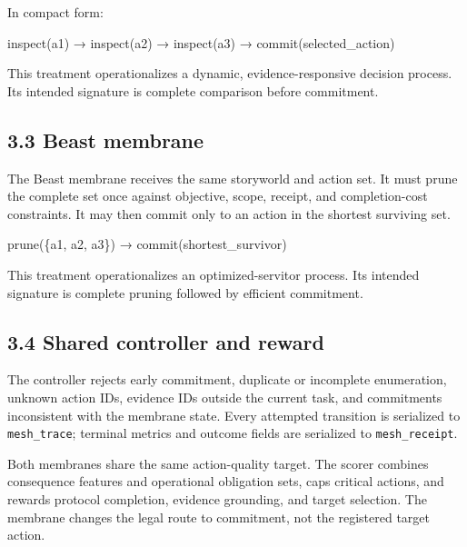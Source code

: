\documentclass[
  11pt,
  letterpaper,
]{article}
\newenvironment{Shaded}{}{}
\newcommand{\NormalTok}[1]{#1}
\begin{document}
In compact form:

\begin{Shaded}
\begin{Highlighting}[]
\NormalTok{inspect(a1) → inspect(a2) → inspect(a3) → commit(selected\_action)}
\end{Highlighting}
\end{Shaded}

This treatment operationalizes a dynamic, evidence-responsive decision
process. Its intended signature is complete comparison before
commitment.

\subsection{3.3 Beast membrane}\label{beast-membrane}

The Beast membrane receives the same storyworld and action set. It must
prune the complete set once against objective, scope, receipt, and
completion-cost constraints. It may then commit only to an action in the
shortest surviving set.

\begin{Shaded}
\begin{Highlighting}[]
\NormalTok{prune(\{a1, a2, a3\}) → commit(shortest\_survivor)}
\end{Highlighting}
\end{Shaded}

This treatment operationalizes an optimized-servitor process. Its
intended signature is complete pruning followed by efficient commitment.

\subsection{3.4 Shared controller and
reward}\label{shared-controller-and-reward}

The controller rejects early commitment, duplicate or incomplete
enumeration, unknown action IDs, evidence IDs outside the current task,
and commitments inconsistent with the membrane state. Every attempted
transition is serialized to \texttt{mesh\_trace}; terminal metrics and
outcome fields are serialized to \texttt{mesh\_receipt}.

Both membranes share the same action-quality target. The scorer combines
consequence features and operational obligation sets, caps critical
actions, and rewards protocol completion, evidence grounding, and target
selection. The membrane changes the legal route to commitment, not the
registered target action.
\end{document}
